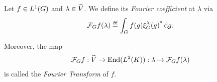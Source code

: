 \begin{definition}
\label{definition:Fourier_Transform}
    Let $f \in {L^{1} (G)}$ and $\lambda \in {\widehat{V}}$.
    We define its \emph{Fourier coefficient} at $\lambda$ via
    \begin{align*}
        \Fourier{f}(\lambda) \defeq \int_\Group f(g) \adj{\Rep{\lambda}(g)} \dd g.
    \end{align*}

    Moreover, the map
    \begin{align*}
        \mathcal{F}_{G}{f} : {\widehat{V}} \to \operatorname{End}({L^{2} (K)}) :
        \lambda \mapsto \mathcal{F}_{G}{f}(\lambda)
    \end{align*}
    is called the \emph{Fourier Transform} of $f$.
\end{definition}

